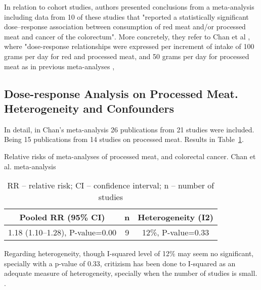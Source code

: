 \documentclass{article}
\begin{document}
In relation to cohort studies, authors presented conclusions from a meta-analysis including data from 10
of these studies that "reported a statistically significant dose–response association between consumption
of red meat and/or processed meat and cancer of the colorectum". More concretely, they refer to Chan et al \cite{chan}, where "dose-response relationships were expressed per increment of intake of 100 grams
per day for red and processed meat, and 50 grams per day for processed meat as in previous meta-analyses \cite{aicr}, \cite{sandhu}


\subsection{Dose-response Analysis on Processed Meat. Heterogeneity and Confounders}

In detail, in Chan's meta-analysis \cite{chan} 26 publications from 21 studies were included. Being 15 publications from 14 studies on processed meat. Results in Table~\ref{tab:table}.

\begin{table}
 \caption{Relative risks of meta-analyses of processed meat, and colorectal cancer. Chan et al. meta-analysis}
  \centering

  \begin{center}
   \begin{tabular}{||c c c||}
   \hline
   Pooled RR (95\% CI)     & n     & Heterogeneity (I2)\\ [0.5ex]
   \hline\hline
     1.18 (1.10–1.28), P-value=0.00  & 9 & 12\%, P-value=0.33     \\ [1ex]
   \hline
  \end{tabular}

  \caption*{RR – relative risk; CI – confidence interval; n – number of studies}
  \end{center}

  \label{tab:table}
\end{table}

Regarding heterogeneity, though I-squared level of 12\% may seem no significant, specially with a p-value of 0.33, critizism has been done to I-squared as an adequate measure of heterogeneity, specially when the number of studies is small. \cite{hippel}.
\end{document}
